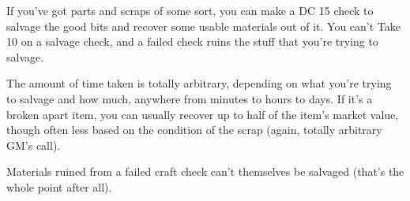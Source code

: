 If you've got parts and scraps of some sort, you can make a DC 15 check to salvage the good bits and recover some usable materials out of it. You can't Take 10 on a salvage check, and a failed check ruins the stuff that you're trying to salvage.

The amount of time taken is totally arbitrary, depending on what you're trying to salvage and how much, anywhere from minutes to hours to days. If it's a broken apart item, you can usually recover up to half of the item's market value, though often less based on the condition of the scrap (again, totally arbitrary GM's call).

Materials ruined from a failed craft check can't themselves be salvaged (that's the whole point after all).
